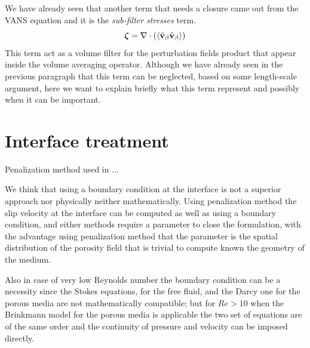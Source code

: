 We have already seen that another term that needs a closure came out from the VANS equation and it is the \textit{sub-filter stresses} term.
$$\boldsymbol{\zeta} = \nabla \cdot \left({\left< \tilde{\textbf{v}}_{\beta} \tilde{\textbf{v}}_{\beta} \right>}\right)$$
This term act as a volume filter for the perturbation fields product that appear inside the volume averaging operator.
Although we have already seen in the previous paragraph that this term can be neglected, based on some length-scale argument, here we want to explain briefly what this term represent and possibly when it can be important.


%

\section{Interface treatment}
\label{ch:interface}
Penalization method \citet{angot1999penalization} used in\cite{bruneau2004passive} \cite{bruneau2008numerical} \cite{bruneau2010coupling}...


We think that using a boundary condition at the interface is not a superior approach nor physically neither mathematically.
Using penalization method the slip velocity at the interface can be computed as well as using a boundary condition, and either methods require a parameter to close the formulation, with the advantage using penalization method that the parameter is the spatial distribution of the porosity field that is trivial to compute known the geometry of the medium.

Also in case of very low Reynolds number the boundary condition can be a necessity since the Stokes equations, for the free fluid, and the Darcy one for the porous media are not mathematically compatible; but for $Re>10$ when the Brinkmann model for the porous media is applicable the two set of equations are of the same order and the continuity of pressure and velocity can be imposed directly.

